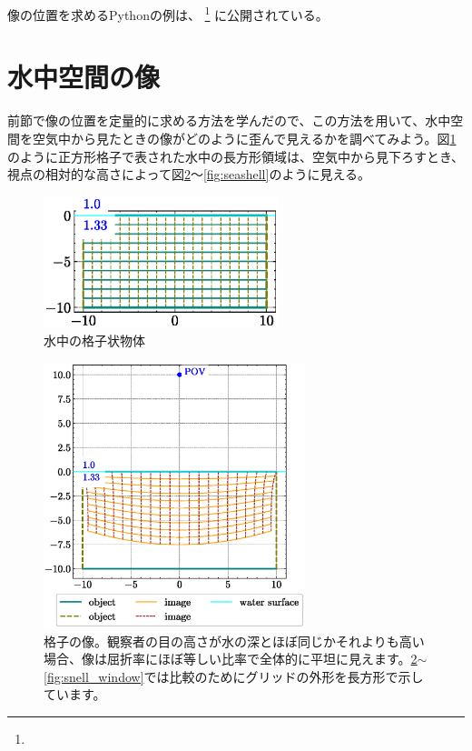 \documentclass[twocolumn]{article}
\begin{document}
像の位置を求めるPythonの例は、
\href{https://github.com/mingshey/python_projects/blob/main/Refraction_Image_en.ipynb}%
{}\footnote{} に公開されている。

\section{水中空間の像}

前節で像の位置を定量的に求める方法を学んだので、この方法を用いて、水中空間を空気中から見たときの像がどのように歪んで見えるかを調べてみよう。図\ref{fig:grid_underwater}のように正方形格子で表された水中の長方形領域は、空気中から見下ろすとき、視点の相対的な高さによって図\ref{fig:image_underwater}〜\ref{fig:seashell}のように見える。

\begin{figure}[!h]
	\centering
	\includegraphics[width=2.7in]{figs/grid_underwater.eps}
	\caption{水中の格子状物体}
	\label{fig:grid_underwater}
\end{figure}

\begin{figure}[!t]
	\centering
	\includegraphics[width=3in]{figs/image_underwater1.eps}
	\caption{格子の像。観察者の目の高さが水の深とほぼ同じかそれよりも高い場合、像は屈折率にほぼ等しい比率で全体的に平坦に見えます。\ref{fig:image_underwater}$\sim$\ref{fig:snell_window}では比較のためにグリッドの外形を長方形で示しています。}
	\label{fig:image_underwater}
\end{figure}
\end{document}
